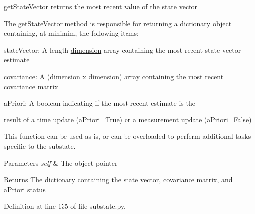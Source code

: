 \hyperlink{classmodest_1_1substates_1_1substate_1_1SubState_a1d8050de59c58969164f577899a55aa2}{get\+State\+Vector} returns the most recent value of the state vector 

The \hyperlink{classmodest_1_1substates_1_1substate_1_1SubState_a1d8050de59c58969164f577899a55aa2}{get\+State\+Vector} method is responsible for returning a dictionary object containing, at minimim, the following items\+:


\begin{DoxyItemize}
\item \textquotesingle{}state\+Vector\textquotesingle{}\+: A length \hyperlink{classmodest_1_1substates_1_1substate_1_1SubState_ab9027f6d1d7d57c47731612f519b7ee6}{dimension} array containing the most recent state vector estimate
\item \textquotesingle{}covariance\textquotesingle{}\+: A (\hyperlink{classmodest_1_1substates_1_1substate_1_1SubState_ab9027f6d1d7d57c47731612f519b7ee6}{dimension} x \hyperlink{classmodest_1_1substates_1_1substate_1_1SubState_ab9027f6d1d7d57c47731612f519b7ee6}{dimension}) array containing the most recent covariance matrix
\item \textquotesingle{}a\+Priori\textquotesingle{}\+: A boolean indicating if the most recent estimate is the
\item result of a time update (a\+Priori=True) or a measurement update (a\+Priori=False)
\end{DoxyItemize}

This function can be used as-\/is, or can be overloaded to perform additional tasks specific to the substate.


\begin{DoxyParams}{Parameters}
{\em self} & The object pointer\\
\hline
\end{DoxyParams}
\begin{DoxyReturn}{Returns}
The dictionary containing the state vector, covariance matrix, and a\+Priori status 
\end{DoxyReturn}


Definition at line 135 of file substate.\+py.

